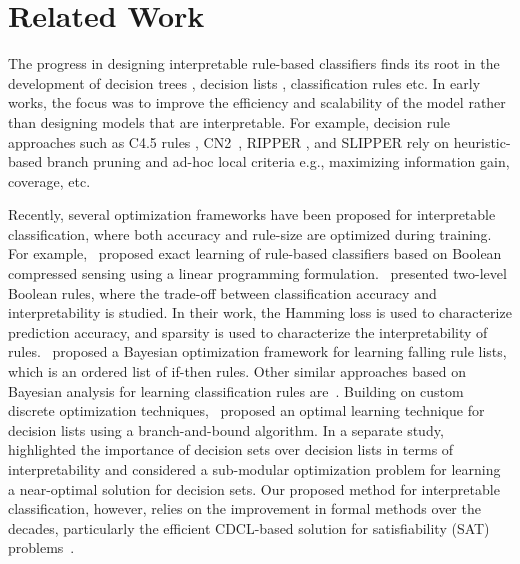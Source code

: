 \section{Related Work}
\label{interpretability_imli_sec:related}

The progress in designing interpretable rule-based classifiers finds its root in the development of decision trees \cite{bessiere2009minimising,quinlan1986induction,quinlan1987simplifying}, decision lists \cite{rivest1987learning}, classification rules \cite{cohen1995fast} etc.  In early works, the focus was to improve the efficiency and scalability of the model rather than designing models that are interpretable. For example,  decision rule approaches such as  C4.5 rules \cite{quinlan2014}, CN2~\cite{ClarkN1989}, RIPPER \cite{cohen1995fast}, and SLIPPER  \cite{CohenS1999} 
rely on heuristic-based branch pruning and ad-hoc local criteria e.g., maximizing information gain, coverage, etc.

Recently, several optimization frameworks have been proposed for interpretable classification, where both accuracy and rule-size are optimized during training. For example,~\cite{malioutov2013exact} proposed exact learning of rule-based classifiers based on Boolean compressed sensing using a linear programming formulation.~\cite{su2016learning} presented two-level Boolean rules, where the trade-off between classification accuracy and interpretability is studied. In their work, the Hamming loss is used to characterize prediction accuracy, and sparsity is used to characterize the interpretability of rules.~\cite{wang2015falling} proposed a Bayesian optimization framework for learning falling rule lists, which is an ordered list of if-then rules. Other similar approaches based on Bayesian analysis for learning classification rules are~\cite{letham2015interpretable,wang2017bayesian}. Building on custom discrete optimization techniques,~\cite{angelino2017learning} proposed an optimal learning technique for decision lists using a branch-and-bound algorithm. In a separate study,~\cite{lakkaraju2016interpretable} highlighted the importance of decision sets over decision lists in terms of interpretability and considered a sub-modular optimization problem for learning a near-optimal solution for decision sets. Our proposed method for interpretable classification, however, relies on the improvement in formal methods over the decades, particularly the efficient CDCL-based solution for satisfiability (SAT) problems~\cite{silva2003grasp}. 




